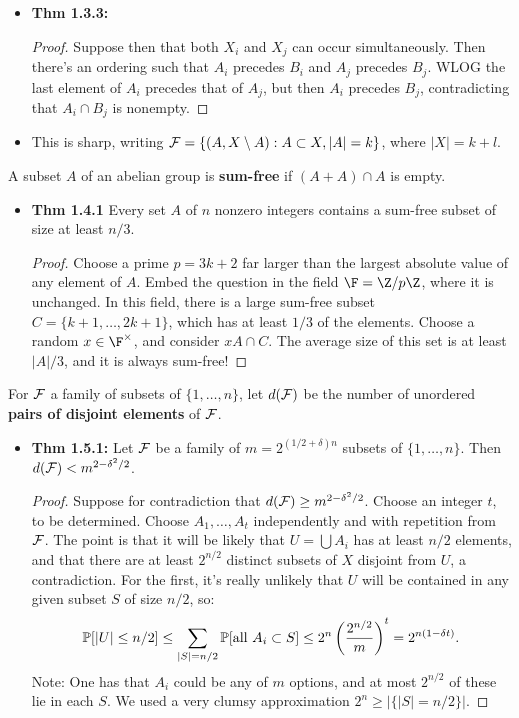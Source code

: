 \documentclass[11pt]{article}
\newenvironment{INT}[1][]{\begin{itemize}\small\item\textbf{#1}}{\end{itemize}}
\begin{document}
\begin{itemise}
\begin{INT}[Thm 1.3.3:]
\begin{proof}
\INDENT Suppose then that both $X_i$ and $X_j$ can occur simultaneously. Then there's an ordering such that $A_i$ precedes $B_i$ and $A_j$ precedes $B_j$. WLOG the last element of $A_i$ precedes that of $A_j$, but then $A_i$ precedes $B_j$, contradicting that $A_i\cap B_j$ is nonempty.
\end{proof}
\item This is sharp, writing $\mathcal{F}=\{(A,X\setminus A) : A\subset X, |A|=k\}$, where $|X|=k+l$.
\end{INT}
\item A subset $A$ of an abelian group is \textbf{sum-free} if $(A+A)\cap A$ is empty.
\begin{INT}[Thm 1.4.1]
Every set $A$ of $n$ nonzero integers contains a sum-free subset of size at least $n/3$.
\begin{proof}
Choose a prime $p=3k+2$ far larger than the largest absolute value of any element of $A$. Embed the question in the field $\F=\Z/p\Z$, where it is unchanged. In this field, there is a large sum-free subset $C=\{k+1,\ldots,2k+1\}$, which has at least $1/3$ of the elements. Choose a random $x\in\F^\times$, and consider $xA\cap C$. The average size of this set is at least $|A|/3$, and it is always sum-free!
\end{proof}
\end{INT}
\item For $\mathcal{F}$ a family of subsets of $\{1,\ldots,n\}$, let $d(\mathcal{F})$ be the number of unordered \textbf{pairs of disjoint elements} of $\mathcal{F}$.
\begin{INT}[Thm 1.5.1:]
Let $\mathcal{F}$ be a family of $m=2^{(1/2+\delta)n}$ subsets of $\{1,\ldots,n\}$. Then $d(\mathcal{F})<m^{2-\delta^2/2}$.
\begin{proof}
Suppose for contradiction that $d(\mathcal{F})\geq m^{2-\delta^2/2}$. Choose an integer $t$, to be determined. Choose $A_1,\ldots,A_t$ independently and with repetition from $\mathcal{F}$. The point is that it will be likely that $U=\bigcup A_i$ has at least $n/2$ elements, and that there are at least $2^{n/2}$ distinct subsets of $X$ disjoint from $U$, a contradiction. For the first, it's really unlikely that $U$ will be contained in any given subset $S$ of size $n/2$, so:
\[\operatorname{\mathbb{P}}[|U|\leq n/2]\leq \sum_{|S|=n/2}\operatorname{\mathbb{P}}[\text{all $A_i\subset S$}]\leq 2^n\left(\frac{2^{n/2}}{m}\right)^t=2^{n(1-\delta t)}.\]
Note: One has that $A_i$ could be any of $m$ options, and at most $2^{n/2}$ of these lie in each $S$. We used a very clumsy approximation $2^n\geq |\{|S|=n/2\}|$.


\end{proof}
\end{INT}
\end{itemise}
\end{document}
